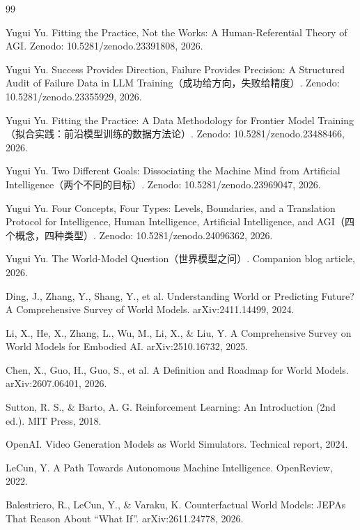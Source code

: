 \documentclass[10pt]{article}
\begin{document}
\begin{thebibliography}{99}\small

Yugui Yu. Fitting the Practice, Not the Works: A Human-Referential Theory of AGI. Zenodo: 10.5281/zenodo.23391808, 2026.

Yugui Yu. Success Provides Direction, Failure Provides Precision: A Structured Audit of Failure Data in LLM Training（成功给方向，失败给精度）. Zenodo: 10.5281/zenodo.23355929, 2026.

Yugui Yu. Fitting the Practice: A Data Methodology for Frontier Model Training（拟合实践：前沿模型训练的数据方法论）. Zenodo: 10.5281/zenodo.23488466, 2026.

Yugui Yu. Two Different Goals: Dissociating the Machine Mind from Artificial Intelligence（两个不同的目标）. Zenodo: 10.5281/zenodo.23969047, 2026.

Yugui Yu. Four Concepts, Four Types: Levels, Boundaries, and a Translation Protocol for Intelligence, Human Intelligence, Artificial Intelligence, and AGI（四个概念，四种类型）. Zenodo: 10.5281/zenodo.24096362, 2026.

Yugui Yu. The World-Model Question（世界模型之问）. Companion blog article, 2026.

Ding, J., Zhang, Y., Shang, Y., et al. Understanding World or Predicting Future? A Comprehensive Survey of World Models. arXiv:2411.14499, 2024.

Li, X., He, X., Zhang, L., Wu, M., Li, X., \& Liu, Y. A Comprehensive Survey on World Models for Embodied AI. arXiv:2510.16732, 2025.

Chen, X., Guo, H., Guo, S., et al. A Definition and Roadmap for World Models. arXiv:2607.06401, 2026.

Sutton, R. S., \& Barto, A. G. Reinforcement Learning: An Introduction (2nd ed.). MIT Press, 2018.

OpenAI. Video Generation Models as World Simulators. Technical report, 2024.

LeCun, Y. A Path Towards Autonomous Machine Intelligence. OpenReview, 2022.

Balestriero, R., LeCun, Y., \& Varaku, K. Counterfactual World Models: JEPAs That Reason About ``What If''. arXiv:2611.24778, 2026.


\end{thebibliography}
\end{document}
